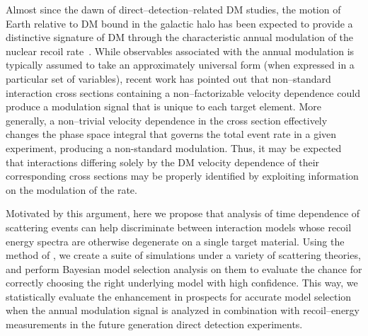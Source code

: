 \documentclass[11pt]{article}
\newcommand{\ie}{{\it i.e.~}}  \newcommand{\eg}{{\it e.g.~}}
\newcommand{\sjwColor}{red}
\newcommand{\sjw}[1]{{\color{\sjwColor} #1}}
\begin{document}
Almost since the dawn of direct--detection--related DM studies, the motion of Earth relative to DM bound in the galactic halo has been expected to provide a distinctive signature of DM through the characteristic annual modulation of the nuclear recoil rate~\cite{Freese:1987wu, Freese:2012xd,Lee:2013xxa,Britto:2014wga,DelNobile:2015nua,Kouvaris:2015xga}. While observables associated with the annual modulation is typically assumed to take an approximately universal form (when expressed in a particular set of variables), recent work \cite{DelNobile:2015tza,DelNobile:2015rmp} has pointed out that non--standard interaction cross sections containing a non--factorizable velocity dependence could produce a modulation signal that is unique to each target element. More generally, a non--trivial velocity dependence in the cross section effectively changes the phase space integral that governs the total event rate in a given experiment, producing a non-standard modulation. Thus, it may be expected that interactions differing solely by the DM velocity dependence of their corresponding cross sections may be properly identified by exploiting information on the modulation of the rate.


Motivated by this argument, here we propose that analysis of time dependence of scattering events can help discriminate between interaction models whose recoil energy spectra are otherwise degenerate on a single target material. Using the method of \cite{Gluscevic:2015sqa}, we create a suite of simulations under a variety of scattering theories, and perform Bayesian model selection analysis on them to evaluate the chance for correctly choosing the right underlying model with high confidence. This way, we statistically evaluate the enhancement in prospects for accurate model selection when the annual modulation signal is analyzed in combination with recoil--energy measurements in the future generation direct detection experiments. 


\end{document}
